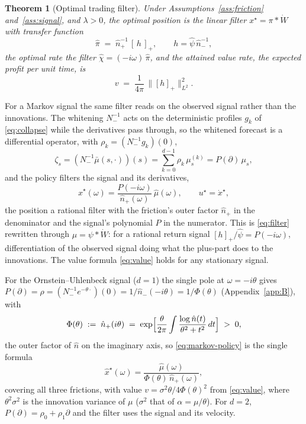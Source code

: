 \documentclass[11pt]{article}
\newcommand{\pluspart}[1]{\left[#1\right]_+}
\theoremstyle{plain}
\newtheorem{theorem}{Theorem}
\theoremstyle{definition}
\theoremstyle{remark}
\begin{document}
\begin{theorem}[Optimal trading filter]\label{thm:filter}
Under Assumptions~\ref{ass:friction} and~\ref{ass:signal}, and $\lambda>0$, the optimal position is the linear filter $x^\star=\pi\ast\dot W$ with transfer function
\begin{equation}\label{eq:filter}
\hat\pi \;=\; \hat n_+^{-1}\,\pluspart{\,h\,},
\qquad h = \hat\psi\,\hat n_-^{-1},
\end{equation}
the optimal rate the filter $\hat\chi=(-i\omega)\,\hat\pi$, and the attained value rate, the expected profit per unit time, is
\begin{equation}\label{eq:value}
v \;=\; \frac{1}{4\pi}\,\bigl\|\pluspart{h}\bigr\|_{L^2}^2 .
\end{equation}
\end{theorem}

For a Markov signal the same filter reads on the observed signal rather than the innovations. The whitening $N_-^{-1}$ acts on the deterministic profiles $g_k$ of \eqref{eq:collapse} while the derivatives pass through, so the whitened forecast is a differential operator, with $\rho_k=(N_-^{-1}g_k)(0)$,
\begin{equation}\label{eq:zeta-collapse}
\zeta_s = (N_-^{-1}\bar\mu(s,\cdot))(s) = \sum_{k=0}^{d-1}\rho_k\,\mu^{(k)}_s = P(\partial)\,\mu_s,
\end{equation}
and the policy filters the signal and its derivatives,
\begin{equation}\label{eq:markov-policy}
\hat x^\star(\omega)=\frac{P(-i\omega)}{\hat n_+(\omega)}\,\hat\mu(\omega), \qquad u^\star = \dot x^\star,
\end{equation}
the position a rational filter with the friction's outer factor $\hat n_+$ in the denominator and the signal's polynomial $P$ in the numerator. This is \eqref{eq:filter} rewritten through $\mu=\psi\ast\dot W$: for a rational return signal $\pluspart{h}/\hat\psi=P(-i\omega)$, differentiation of the observed signal doing what the plus-part does to the innovations. The value formula \eqref{eq:value} holds for any stationary signal.

For the Ornstein--Uhlenbeck signal ($d=1$) the single pole at $\omega=-i\theta$ gives $P(\partial)=\rho=(N_-^{-1}e^{-\theta\cdot})(0)=1/\hat n_-(-i\theta)=1/\Phi(\theta)$ (Appendix~\ref{app:B}), with
\begin{equation}\label{eq:phi}
\Phi(\theta) \;:=\; \hat n_+(i\theta) \;=\; \exp\Bigl[\frac{\theta}{2\pi}\int\frac{\log\hat n(t)}{\theta^2+t^2}\,dt\Bigr] \;>\;0,
\end{equation}
the outer factor of $\hat n$ on the imaginary axis, so \eqref{eq:markov-policy} is the single formula
\begin{equation}\label{eq:ou-filter}
\hat x^\star(\omega) = \frac{\hat\mu(\omega)}{\Phi(\theta)\,\hat n_+(\omega)},
\end{equation}
covering all three frictions, with value $v=\sigma^2\theta/4\Phi(\theta)^2$ from \eqref{eq:value}, where $\theta^2\sigma^2$ is the innovation variance of $\mu$ ($\sigma^2$ that of $\alpha=\mu/\theta$). For $d=2$, $P(\partial)=\rho_0+\rho_1\partial$ and the filter uses the signal and its velocity.
\end{document}

